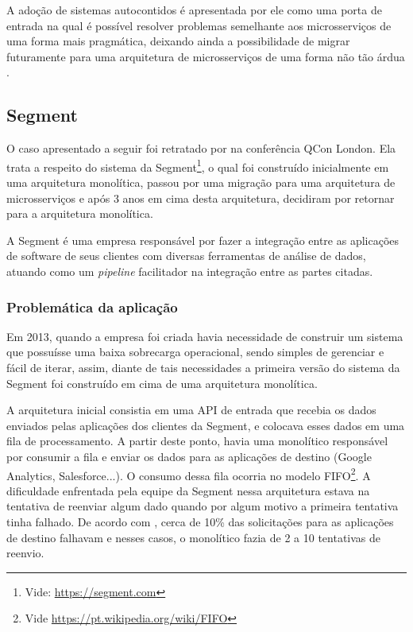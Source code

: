 A adoção de sistemas autocontidos é apresentada por ele como uma porta de entrada na qual é possível
resolver problemas semelhante aos microsserviços de uma forma mais pragmática, deixando ainda a
possibilidade de migrar futuramente para uma arquitetura de microsserviços de uma forma não tão
árdua \cite{Guido2016:WhyMicroservices}.

\subsection{Segment}

O caso apresentado a seguir foi retratado por  na
conferência QCon London. Ela trata a respeito do sistema da Segment\footnote{Vide:
\url{https://segment.com}}, o qual foi construído inicialmente em uma arquitetura monolítica,
passou por uma migração para uma arquitetura de microsserviços e após 3 anos em cima desta
arquitetura, decidiram por retornar para a arquitetura monolítica.

A Segment é uma empresa responsável por fazer a integração entre as aplicações de software de seus
clientes com diversas ferramentas de análise de dados, atuando como um \textit{pipeline} facilitador
na integração entre as partes citadas. 

\subsubsection{Problemática da aplicação}

Em 2013, quando a empresa foi criada havia necessidade de construir um sistema que possuísse uma
baixa sobrecarga operacional, sendo simples de gerenciar e fácil de iterar, assim, diante de tais
necessidades a primeira versão do sistema da Segment foi construído em cima de uma arquitetura monolítica.

A arquitetura inicial consistia em uma \gls{API} de entrada que recebia os dados enviados pelas aplicações dos
clientes da Segment, e colocava esses dados em uma fila de processamento. A partir deste ponto,
havia uma monolítico responsável por consumir a fila e enviar os dados para as aplicações de destino
(Google Analytics, Salesforce...). O consumo dessa fila ocorria no modelo \gls{FIFO}\footnote{Vide
\url{https://pt.wikipedia.org/wiki/FIFO}}. A dificuldade enfrentada pela equipe da Segment nessa
arquitetura estava na tentativa de reenviar algum dado quando por algum motivo a primeira tentativa
tinha falhado. De acordo com , cerca de 10\% das
solicitações para as aplicações de destino falhavam e nesses casos, o monolítico fazia de 2 a 10
tentativas de reenvio.


